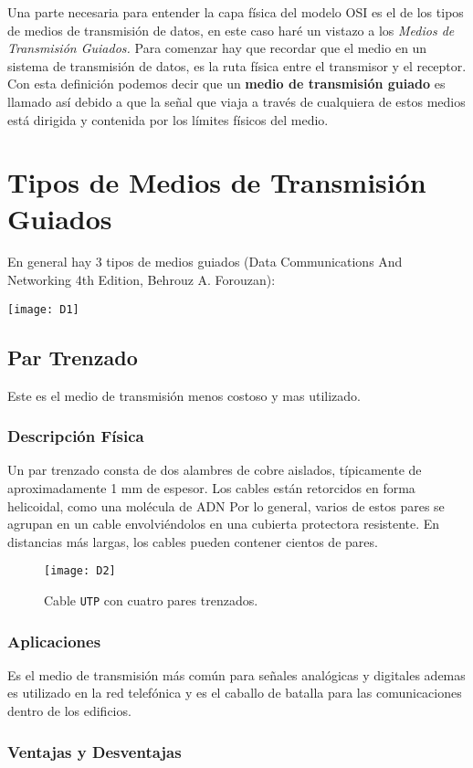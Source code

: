 Una parte necesaria para entender la capa física del modelo OSI es el de los tipos de medios de transmisión de datos, en este caso haré un vistazo a los \textit{Medios de Transmisión Guiados.} 
Para comenzar hay que recordar que el medio en un sistema de transmisión de datos, es la ruta física entre el transmisor y el receptor. Con esta definición podemos decir que un \textbf{medio de transmisión guiado} es llamado así debido a que la señal que viaja a través de cualquiera de estos medios está dirigida y contenida por los límites físicos del medio.
\section{Tipos de Medios de Transmisión Guiados}
En general hay 3 tipos de medios guiados (Data Communications And Networking 4th Edition, Behrouz A. Forouzan): \\
\begin{center}
\texttt{[image: D1]}
\end{center}
\subsection{Par Trenzado}
Este es el medio de transmisión menos costoso y mas utilizado.
\subsubsection{Descripción Física}
Un par trenzado consta de dos alambres de cobre aislados, típicamente de aproximadamente 1 mm de espesor. Los cables están retorcidos en forma helicoidal, como una molécula de ADN Por lo general, varios de estos pares se agrupan en un cable envolviéndolos en una cubierta protectora resistente. En distancias más largas, los cables pueden contener cientos de pares.
\begin{figure}[!ht]
\centering
\texttt{[image: D2]}
\caption{Cable \texttt{UTP} con cuatro pares trenzados.}
\end{figure}
\subsubsection{Aplicaciones}
Es el medio de transmisión más común para señales analógicas y digitales ademas es utilizado en la red telefónica y es el caballo de batalla para las comunicaciones dentro de los edificios.
\subsubsection{Ventajas y Desventajas}

